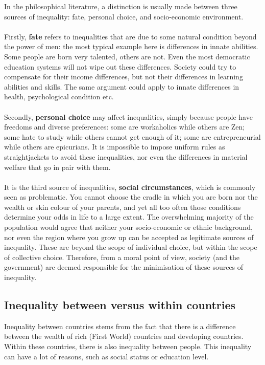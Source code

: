 \documentclass[../summary.tex]{subfiles}
\begin{document}
	In the philosophical literature, a distinction is usually made between three sources of inequality: fate, personal choice, and socio-economic environment.
	\\\\
	Firstly, \textbf{fate} refers to inequalities that are due to some natural condition beyond the power of men: the most typical example here is differences in innate abilities. Some people are born very talented, others are not. Even the most democratic education systems will not wipe out these differences. Society could try to compensate for their income differences, but not their differences in learning abilities and skills. The same argument could apply to innate differences in health, psychological condition etc. 
	\\\\
	Secondly, \textbf{personal choice} may affect inequalities, simply because people have freedoms and diverse preferences: some are workaholics while others are Zen; some hate to study while others cannot get enough of it; some are entrepreneurial while others are epicurians. It is impossible to impose uniform rules as straightjackets to avoid these inequalities, nor even the differences in material welfare that go in pair with them.
	\\\\
	It is the third source of inequalities, \textbf{social circumstances}, which is commonly seen as problematic. You cannot choose the cradle in which you are born nor the wealth or skin colour of your parents, and yet all too often those conditions determine your odds in life to a large extent. The overwhelming majority of the population would agree that neither your socio-economic or ethnic background, nor even the region where you grow up can be accepted as legitimate sources of inequality. These are beyond the scope of individual choice, but within the scope of collective choice. Therefore, from a moral point of view, society (and the government) are deemed responsible for the minimisation of these sources of inequality. 
	
	\subsection{Inequality between versus within countries}
	
	Inequality between countries stems from the fact that there is a difference between the wealth of rich (First World) countries and developing countries. Within these countries, there is also inequality between people. This inequality can have a lot of reasons, such as social status or education level.
	
\end{document}
